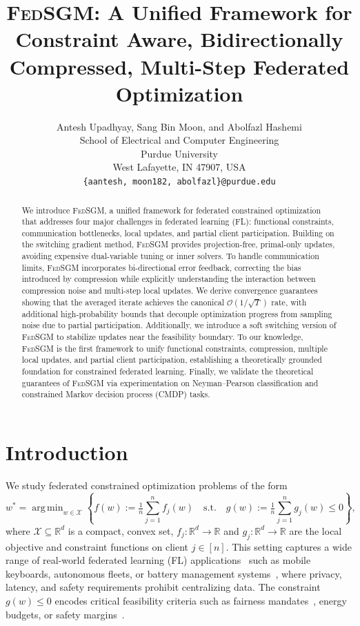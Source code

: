\documentclass{article} %
\title{\textsc{FedSGM}: A Unified Framework for Constraint Aware, 
       Bidirectionally Compressed, Multi-Step Federated Optimization}
\author{Antesh Upadhyay, Sang Bin Moon, and Abolfazl Hashemi \\
School of Electrical and Computer Engineering\\
Purdue University\\
West Lafayette, IN 47907, USA \\
\texttt{\{aantesh, moon182, abolfazl\}@purdue.edu} \\
}
\DeclareMathOperator*{\argmin}{arg\,min}
\def\R{{\mathbb{R}}}
\begin{document}
\maketitle
\begin{abstract}
We introduce \textsc{FedSGM}, a unified framework for federated constrained optimization that addresses four major challenges in federated learning (FL): functional constraints, communication bottlenecks, local updates, and partial client participation. Building on the switching gradient method, \textsc{FedSGM} provides projection-free, primal-only updates, avoiding expensive dual-variable tuning or inner solvers. To handle communication limits, \textsc{FedSGM} incorporates bi-directional error feedback, correcting the bias introduced by compression while explicitly understanding the interaction between compression noise and multi-step local updates. We derive convergence guarantees showing that the averaged iterate achieves the canonical $\mathcal{O}(1/\sqrt{T})$ rate, with additional high-probability bounds that decouple optimization progress from sampling noise due to partial participation. Additionally, we introduce a soft switching version of \textsc{FedSGM} to stabilize updates near the feasibility boundary. To our knowledge, \textsc{FedSGM} is the first framework to unify functional constraints, compression, multiple local updates, and partial client participation, establishing a theoretically grounded foundation for constrained federated learning. Finally, we validate the theoretical guarantees of \textsc{FedSGM} via experimentation on Neyman–Pearson classification and constrained Markov decision process (CMDP) tasks.
\end{abstract}

\section{Introduction}\label{sec:intro}

We study federated constrained optimization problems of the form
\begin{equation}
\label{eq:op_prb}
    w^* = \argmin_{w \in \mathcal{X}} \left\{f(w) := \tfrac{1}{n}\sum_{j=1}^n f_j(w)
    \quad \text{s.t.} \quad g(w) := \tfrac{1}{n}\sum_{j=1}^n g_j(w) \leq 0\right\},
\end{equation}
where $\mathcal{X} \subseteq \R^d$ is a compact, convex set, $f_j:\mathbb{R}^d \to \mathbb{R}$ and $g_j:\mathbb{R}^d \to \mathbb{R}$ are the local objective and constraint functions on client $j \in [n]$. This setting captures a wide range of real-world federated learning (FL) applications~\citep{konevcny2016federated,kairouz2021advances,mcmahan2017communication} such as mobile keyboards, autonomous fleets, or battery management systems~\citep{kalashnikov2018scalable,brohan2022rt,zhang2023batteryml}, where privacy, latency, and safety requirements prohibit centralizing data. The constraint $g(w)\leq 0$ encodes critical feasibility criteria such as fairness mandates~\citep{agarwal2018reductions}, energy budgets, or safety margins~\citep{zhang2023batteryml}. 
\end{document}
